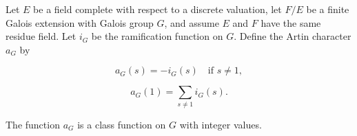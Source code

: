 Let $E$ be a field complete with respect to a discrete valuation, let $F/E$ be a finite Galois extension with Galois group $G$, and assume $E$ and $F$ have the same residue field. Let $i_G$ be the ramification function on $G$. Define the Artin character $a_G$ by

$$a_G(s) = -i_G(s) \quad \text{if } s \neq 1,$$

$$a_G(1) = \sum_{s \neq 1} i_G(s).$$

The function $a_G$ is a class function on $G$ with integer values.
